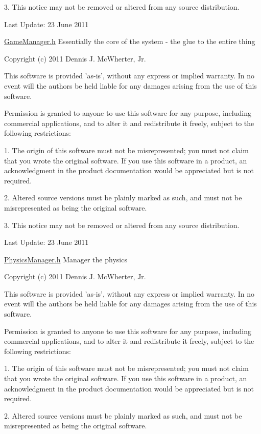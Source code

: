 3. This notice may not be removed or altered from any source distribution.

Last Update: 23 June 2011

\hyperlink{_game_manager_8h_source}{GameManager.h} Essentially the core of the system -\/ the glue to the entire thing

Copyright (c) 2011 Dennis J. McWherter, Jr.

This software is provided 'as-\/is', without any express or implied warranty. In no event will the authors be held liable for any damages arising from the use of this software.

Permission is granted to anyone to use this software for any purpose, including commercial applications, and to alter it and redistribute it freely, subject to the following restrictions:

1. The origin of this software must not be misrepresented; you must not claim that you wrote the original software. If you use this software in a product, an acknowledgment in the product documentation would be appreciated but is not required.

2. Altered source versions must be plainly marked as such, and must not be misrepresented as being the original software.

3. This notice may not be removed or altered from any source distribution.

Last Update: 23 June 2011

\hyperlink{_physics_manager_8h_source}{PhysicsManager.h} Manager the physics

Copyright (c) 2011 Dennis J. McWherter, Jr.

This software is provided 'as-\/is', without any express or implied warranty. In no event will the authors be held liable for any damages arising from the use of this software.

Permission is granted to anyone to use this software for any purpose, including commercial applications, and to alter it and redistribute it freely, subject to the following restrictions:

1. The origin of this software must not be misrepresented; you must not claim that you wrote the original software. If you use this software in a product, an acknowledgment in the product documentation would be appreciated but is not required.

2. Altered source versions must be plainly marked as such, and must not be misrepresented as being the original software.

